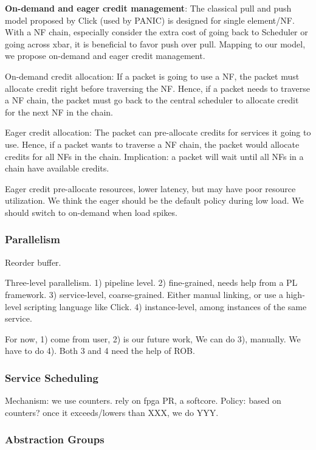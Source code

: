 \textbf{On-demand and eager credit management}:
The classical pull and push model proposed by
Click (used by PANIC) is designed for single element/NF.
With a NF chain, especially consider the extra cost
of going back to Scheduler or going across xbar,
it is beneficial to favor push over pull.
Mapping to our model, we propose on-demand
and eager credit management.

On-demand credit allocation:
If a packet is going to use a NF, the packet must allocate credit right before traversing the NF.
Hence, if a packet needs to traverse a NF chain, the packet must go back to the central scheduler to
allocate credit for the next NF in the chain. 

Eager credit allocation:
The packet can pre-allocate credits for services it going to use.
Hence, if a packet wants to traverse a NF chain, the packet would 
allocate credits for all NFs in the chain.
Implication: a packet will wait until all NFs in a chain have available credits.

Eager credit pre-allocate resources, lower latency, but may have poor resource utilization.
We think the eager should be the default policy during low load.
We should switch to on-demand when load spikes.

\subsubsection{Parallelism}
Reorder buffer.

Three-level parallelism.
1) pipeline level.
2) fine-grained, needs help from a PL framework.
3) service-level, coarse-grained. Either manual linking, or use a high-level scripting language like Click.
4) instance-level, among instances of the same service.

For now, 1) come from user, 2) is our future work,
We can do 3), manually. We have to do 4).
Both 3 and 4 need the help of ROB.


\subsubsection{Service Scheduling}
Mechanism: we use counters. rely on fpga PR, a softcore.
Policy: based on counters? once it exceeds/lowers than XXX, we do YYY.

\subsubsection{Abstraction Groups}

